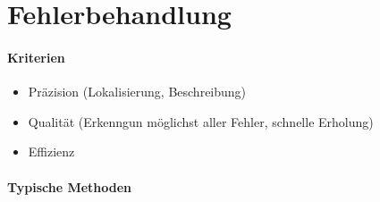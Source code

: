\section{Fehlerbehandlung}
\paragraph*{Kriterien}
\begin{itemize}
 \item Präzision (Lokalisierung, Beschreibung)
 \item Qualität (Erkenngun möglichst aller Fehler, schnelle Erholung)
 \item Effizienz
\end{itemize}

\paragraph*{Typische Methoden}
